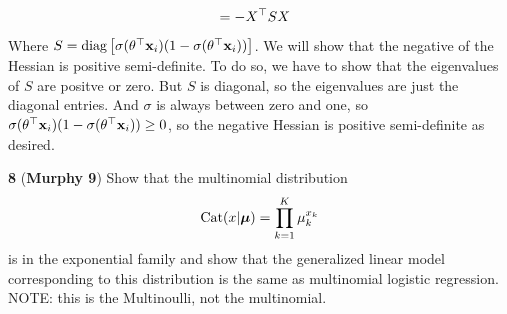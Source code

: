 \documentclass[12pt,letterpaper,fleqn]{hmcpset}
\begin{document}
\begin{solution}
\begin{enumerate}[(a)]
\begin{align*}
                    &= -X^\top S X
                \end{align*}
                Where $S = {\hbox{diag}}\left[\sigma( \theta^\top {\bf x}_i)(1 -  \sigma( \theta^\top {\bf x}_i))\right]$.
                 We will show that the negative of the Hessian is positive semi-definite. To do so, we have to show that the eigenvalues of $S$ are positve or zero. But $S$ is diagonal, so the eigenvalues are just the diagonal entries. 
                 And $\sigma$ is always between zero and one, so
                  $\sigma( \theta^\top {\bf x}_i)(1 -  \sigma( \theta^\top {\bf x}_i)) \geq 0$, so the negative Hessian is positive semi-definite as desired.
	\end{enumerate}
\end{solution}

\textbf{8} (\textbf{Murphy 9}) Show that the multinomial distribution
\[
    \text{Cat}(x|\hbox{\boldmath$\mu$}) = \prod_{k=1}^K \mu_k^{x_k}
\]
is in the exponential family and show that the generalized linear model
corresponding to this distribution is the same as multinomial logistic
regression. NOTE: this is the Multinoulli, not the multinomial.

\vspace{15mm}
\end{document}
